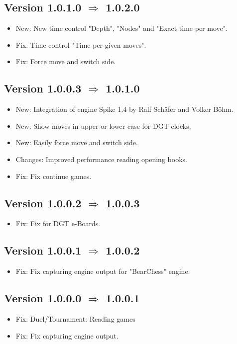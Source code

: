 \documentclass[11pt,a4paper]{article}
\begin{document}
\subsection*{Version 1.0.1.0 $\Rightarrow$  1.0.2.0}
\begin{itemize}		
	\item {\color{blue}New}: New time control "Depth", "Nodes" and "Exact time per move".
	\item {\color{red}Fix}: Time control "Time per given moves".	
	\item {\color{red}Fix}: Force move and switch side.
\end{itemize}

\subsection*{Version 1.0.0.3 $\Rightarrow$  1.0.1.0}
\begin{itemize}		
	\item {\color{blue}New}: Integration of engine Spike 1.4 by Ralf Schäfer and Volker Böhm.
	\item {\color{blue}New}: Show moves in upper or lower case for DGT clocks.
	\item {\color{blue}New}: Easily force move and switch side.
	\item {\color{teal}Changes}: Improved performance reading opening books.
	\item {\color{red}Fix}: Fix continue games.	
\end{itemize}

\subsection*{Version 1.0.0.2 $\Rightarrow$  1.0.0.3}
\begin{itemize}		
	\item {\color{red}Fix}: Fix for DGT e-Boards.	
\end{itemize}

\subsection*{Version 1.0.0.1 $\Rightarrow$  1.0.0.2}
\begin{itemize}		
	\item {\color{red}Fix}: Fix capturing engine output for "BearChess" engine.
\end{itemize}

\subsection*{Version 1.0.0.0 $\Rightarrow$  1.0.0.1}
\begin{itemize}	
	\item {\color{red}Fix}: Duel/Tournament: Reading games
	\item {\color{red}Fix}: Fix capturing engine output.
\end{itemize}
\end{document}
